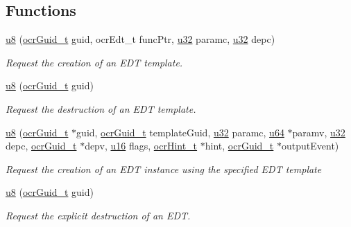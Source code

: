 \subsection*{Functions}
\begin{DoxyCompactItemize}
\item
  \hyperlink{type_u8}{u8} \hyperlink{func_ocrEdtTemplateCreate}
            {}(\hyperlink{type_ocrGuid_t}{ocr\-Guid\-\_\-t} guid,
    ocrEdt\_t funcPtr, \hyperlink{type_u32}{u32} paramc, \hyperlink{type_u32}{u32} depc)
    \begin{DoxyCompactList}
      \small\item \emph{Request the creation of an EDT template.}
    \end{DoxyCompactList}
\item
  \hyperlink{type_u8}{u8} \hyperlink{func_ocrEdtTemplateDestroy}
            {}(\hyperlink{type_ocrGuid_t}{ocr\-Guid\-\_\-t} guid)
  \begin{DoxyCompactList}
    \small\item \emph{Request the destruction of an EDT template.}
  \end{DoxyCompactList}
\item
  \hyperlink{type_u8}{u8} \hyperlink{func_ocrEdtCreate}
            {}(\hyperlink{type_ocrGuid_t}{ocr\-Guid\-\_\-t} $\ast$guid,
    \hyperlink{type_ocrGuid_t}{ocr\-Guid\-\_\-t} template\-Guid,
    \hyperlink{type_u32}{u32} paramc, \hyperlink{type_u64}{u64} $\ast$paramv,
    \hyperlink{type_u32}{u32} depc, \hyperlink{type_ocrGuid_t}{ocr\-Guid\-\_\-t} $\ast$depv,
    \hyperlink{type_u16}{u16} flags, \hyperlink{type_ocrHint_t}{ocr\-Hint\-\_\-t} $\ast$hint,
    \hyperlink{type_ocrGuid_t}{ocr\-Guid\-\_\-t} $\ast$output\-Event)
    \begin{DoxyCompactList}
      \small\item \emph{Request the creation of an EDT instance using
        the specified EDT template}
    \end{DoxyCompactList}
\item
  \hyperlink{type_u8}{u8} \hyperlink{func_ocrEdtDestroy}
            {}(\hyperlink{type_ocrGuid_t}{ocr\-Guid\-\_\-t} guid)
    \begin{DoxyCompactList}
      \small\item \emph{Request the explicit destruction of an EDT.}
    \end{DoxyCompactList}
\end{DoxyCompactItemize}
%
